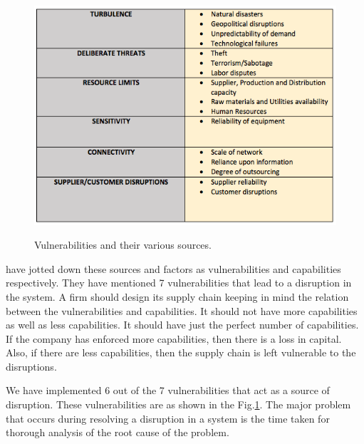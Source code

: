\begin{figure}[H]
  \centering
  \includegraphics[width=6.0in]{figures/pdf/VNTS.png}\\
  \caption{Vulnerabilities and their various sources.}\label{Vulnerabilities}
\end{figure}

 \citep{Pettit2010} have jotted down these sources and factors as vulnerabilities and capabilities respectively. They have mentioned 7 vulnerabilities that lead to a disruption in the system. A firm should design its supply chain keeping in mind the relation between the vulnerabilities and capabilities. It should not have more capabilities as well as less capabilities. It should have just the perfect number of capabilities. If the company has enforced more capabilities, then there is a loss in capital. Also, if there are less capabilities, then the supply chain is left vulnerable to the disruptions.
 
We have implemented 6 out of the 7 vulnerabilities that act as a source of disruption. These vulnerabilities are as shown in the Fig.\ref{Vulnerabilities}. The major problem that occurs during resolving a disruption in a system is the time taken for thorough analysis of the root cause of the problem.

